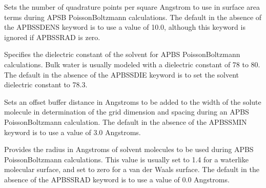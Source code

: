 \documentclass[letterpaper,11pt,english]{sphinxmanual}
\begin{document}
\ignorespaces {}\label{\detokenize{text/keywords:key-apbs-sdens}}\begin{description}
\sphinxAtStartPar
Sets the number of quadrature points per square Angstrom to use in surface area terms during APSB Poisson\sphinxhyphen{}Boltzmann calculations. The default in the absence of the APBS\sphinxhyphen{}SDENS keyword is to use a value of 10.0, although this keyword is ignored if APBS\sphinxhyphen{}SRAD is zero.

\end{description}

\ignorespaces {}\label{\detokenize{text/keywords:key-apbs-sdie}}\begin{description}
\sphinxAtStartPar
Specifies the dielectric constant of the solvent for APBS Poisson\sphinxhyphen{}Boltzmann calculations. Bulk water is usually modeled with a dielectric constant of 78 to 80. The default in the absence of the APBS\sphinxhyphen{}SDIE keyword is to set the solvent dielectric constant to 78.3.

\end{description}

\ignorespaces {}\label{\detokenize{text/keywords:key-apbs-smin}}\begin{description}
\sphinxAtStartPar
Sets an offset buffer distance in Angstroms to be added to the width of the solute molecule in determination of the grid dimension and spacing during an APBS Poisson\sphinxhyphen{}Boltzmann calculation. The default in the absence of the APBS\sphinxhyphen{}SMIN keyword is to use a value of 3.0 Angstroms.

\end{description}

\ignorespaces {}\label{\detokenize{text/keywords:key-apbs-srad}}\begin{description}
\sphinxAtStartPar
Provides the radius in Angstroms of solvent molecules to be used during APBS Poisson\sphinxhyphen{}Boltzmann calculations. This value is usually set to 1.4 for a water\sphinxhyphen{}like molecular surface, and set to zero for a van der Waals surface. The default in the absence of the APBS\sphinxhyphen{}SRAD keyword is to use a value of 0.0 Angstroms.

\end{description}
\end{document}
